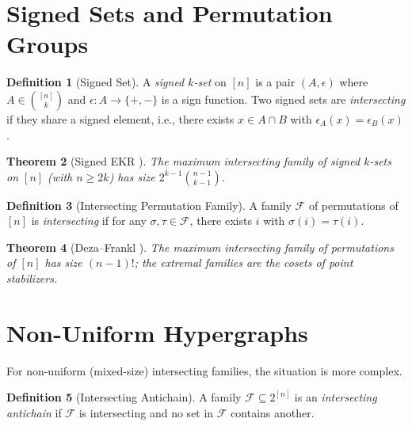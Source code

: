 \documentclass[12pt,a4paper]{amsart}
\newtheorem{theorem}{Theorem}[section]
\theoremstyle{definition}
\newtheorem{definition}[theorem]{Definition}
\theoremstyle{remark}
\begin{document}
\section{Signed Sets and Permutation Groups}\label{sec:signed}

\begin{definition}[Signed Set]
A \emph{signed $k$-set} on $[n]$ is a pair $(A, \epsilon)$ where $A \in \binom{[n]}{k}$
and $\epsilon: A \to \{+, -\}$ is a sign function. Two signed sets are
\emph{intersecting} if they share a signed element, i.e., there exists $x \in A \cap B$
with $\epsilon_A(x) = \epsilon_B(x)$.
\end{definition}

\begin{theorem}[Signed EKR \cite{DezaFranklFuredi1983}]\label{thm:signed_ekr}
The maximum intersecting family of signed $k$-sets on $[n]$ (with $n \geq 2k$) has
size $2^{k-1}\binom{n-1}{k-1}$.
\end{theorem}

\begin{definition}[Intersecting Permutation Family]
A family $\mathcal{F}$ of permutations of $[n]$ is \emph{intersecting} if for any
$\sigma, \tau \in \mathcal{F}$, there exists $i$ with $\sigma(i) = \tau(i)$.
\end{definition}

\begin{theorem}[Deza--Frankl \cite{DezaFranklPerm1983}]\label{thm:deza_frankl_perm}
The maximum intersecting family of permutations of $[n]$ has size $(n-1)!$;
the extremal families are the \emph{cosets} of point stabilizers.
\end{theorem}

\section{Non-Uniform Hypergraphs}\label{sec:non_uniform}

For non-uniform (mixed-size) intersecting families, the situation is more complex.

\begin{definition}[Intersecting Antichain]
A family $\mathcal{F} \subseteq 2^{[n]}$ is an \emph{intersecting antichain} if
$\mathcal{F}$ is intersecting and no set in $\mathcal{F}$ contains another.
\end{definition}
\end{document}
